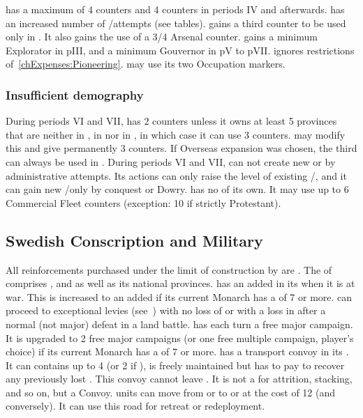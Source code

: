 \bparag \SUE has a maximum of 4 \TP counters and 4 \COL counters in
periods IV and afterwards.
\bparag \SUE has an increased number of \TP/\COL attempts (see tables).
\bparag \SUE gains a third \ARMY counter to be used only in \ROTW.
It also gains the use of a 3/4 Arsenal counter.
\bparag \SUE gains a minimum Explorator in pIII, and a minimum Gouvernor
in pV to pVII.
\bparag \SUE ignores restrictions of~\ref{chExpenses:Pioneering}.
\bparag[] [BLP] \SUE may use its two Occupation markers.


\subsubsection{Insufficient demography}
\aparag During periods VI and VII, \SUE has 2 \ARMY counters unless it
owns at least 5 provinces that are neither in , in
 nor in , in which case it can use 3
\ARMY counters.
\bparag {} may modify this and give \SUE
permanently 3 \ARMY counters.
\bparag If Overseas expansion was chosen, the third \ARMY can always be
used in \ROTW.
\aparag During periods VI and VII, \SUE can not create new \COL or \TP by
administrative attempts. Its actions can only raise the level of
existing \COL/\TP, and it can gain new \TP/\COL only by conquest or
Dowry.
\aparag \SUE has no \CTZ of its own. It may use up to 6 Commercial
Fleet counters (exception: 10 if strictly Protestant).

\subsection{Swedish Conscription and Military}
\label{chSpecific:Sweden:Conscription}
\aparag All reinforcements purchased under the limit of construction by
\SUE are .
\aparag The  of \SUE comprises
,  and  as well as
its national provinces.
\aparag \SUE has an added \ARMY\facemoins in its 
when it is at war. This is increased to an added \ARMY\faceplus if its
current Monarch has a \MIL of 7 or more.
\aparag \SUE can proceed to exceptional levies
(see~) with no loss of \STAB
or with a loss in \STAB after a normal (not major) defeat in a land battle.
\aparag \SUE has each turn a free major campaign. It is upgraded to
2 free major campaigns (or one free multiple campaign, player's choice)
if its current Monarch has a \MIL of 7 or more.
 \SUE has a transport convoy in its
. It can contains up to 4 \NTD (or 2 \NTD if
\facemoins), is freely maintained but \SUE has to pay to recover any
previously lost \NTD. This convoy cannot leave . It is
not a \FLEET for attrition, stacking, and so on, but a Convoy.
 \SUE units can move from
 or  to  or
 at the cost of 12 \MP (and conversely).  It can
use this road for retreat or redeployment.

